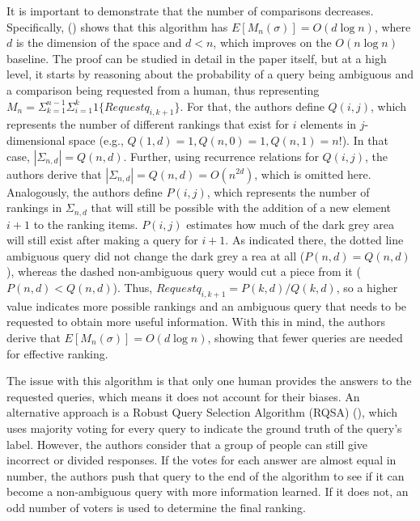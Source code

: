 \documentclass[
  letterpaper,
  numbers=noenddot,
  DIV=11]{scrreprt}
\theoremstyle{plain}
\theoremstyle{definition}
\theoremstyle{remark}
\begin{document}
It is important to demonstrate that the number of comparisons decreases.
Specifically, () shows that
this algorithm has \(E[M_n(\sigma)] = O(d\log n)\), where \(d\) is the
dimension of the space and \(d < n\), which improves on the
\(O(n\log n)\) baseline. The proof can be studied in detail in the paper
itself, but at a high level, it starts by reasoning about the
probability of a query being ambiguous and a comparison being requested
from a human, thus representing
\(M_n = \Sigma_{k=1}^{n-1}\Sigma_{i=1}^k 1\{Requestq_{i,k+1}\}\). For
that, the authors define \(Q(i,j)\), which represents the number of
different rankings that exist for \(i\) elements in \(j\)-dimensional
space (e.g., \(Q(1,d) = 1, Q(n,0) = 1, Q(n,1) = n!\)). In that case,
\(|\Sigma_{n,d}| = Q(n,d)\). Further, using recurrence relations for
\(Q(i,j)\), the authors derive that
\(|\Sigma_{n,d}| = Q(n,d) = O(n^{2d})\), which is omitted here.
Analogously, the authors define \(P(i,j)\), which represents the number
of rankings in \(\Sigma_{n,d}\) that will still be possible with the
addition of a new element \(i+1\) to the ranking items. \(P(i,j)\)
estimates how much of the dark grey area will still exist after making a
query for \(i+1\). As indicated there, the dotted line ambiguous query
did not change the dark grey a rea at all (\(P(n,d) = Q(n,d)\)), whereas
the dashed non-ambiguous query would cut a piece from it
(\(P(n,d) < Q(n,d)\)). Thus, \(Request q_{i,k+1} = P(k,d) / Q(k,d)\), so
a higher value indicates more possible rankings and an ambiguous query
that needs to be requested to obtain more useful information. With this
in mind, the authors derive that \(E[M_n(\sigma)] = O(d\log n)\),
showing that fewer queries are needed for effective ranking.

The issue with this algorithm is that only one human provides the
answers to the requested queries, which means it does not account for
their biases. An alternative approach is a Robust Query Selection
Algorithm (RQSA) (), which
uses majority voting for every query to indicate the ground truth of the
query's label. However, the authors consider that a group of people can
still give incorrect or divided responses. If the votes for each answer
are almost equal in number, the authors push that query to the end of
the algorithm to see if it can become a non-ambiguous query with more
information learned. If it does not, an odd number of voters is used to
determine the final ranking.
\end{document}
